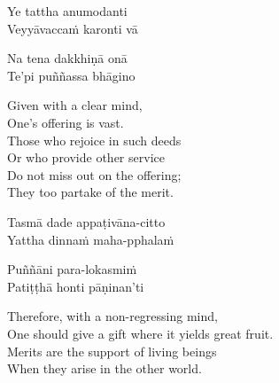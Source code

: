 \begin{pali-hang}
  Ye tattha anumodanti\\
  Veyyāvaccaṁ karonti vā
\end{pali-hang}
\begin{pali-hang-together}
  Na tena dakkhiṇā onā\\
  Te'pi puññassa bhāgino
\end{pali-hang-together}


\begin{english-verses}
  Given with a clear mind,\\
  One's offering is vast.\\
  Those who rejoice in such deeds\\
  Or who provide other service\\
  \ifninebythirteenversion\clearpage\fi
  Do not miss out on the offering;\\
  They too partake of the merit.
\end{english-verses}

\begin{pali-hang}
  Tasmā dade appaṭivāna-citto\\
  Yattha dinnaṁ maha-pphalaṁ
\end{pali-hang}
\ifbfiveversion\clearpage\fi
\begin{pali-hang-together}
  Puññāni para-lokasmiṁ\\
  Patiṭṭhā honti pāṇinan'ti
\end{pali-hang-together}


\begin{english-verses}
  Therefore, with a non-regressing mind,\\
  One should give a gift where it yields great fruit.\\
  Merits are the support of living beings\\
  When they arise in the other world.
\end{english-verses}

